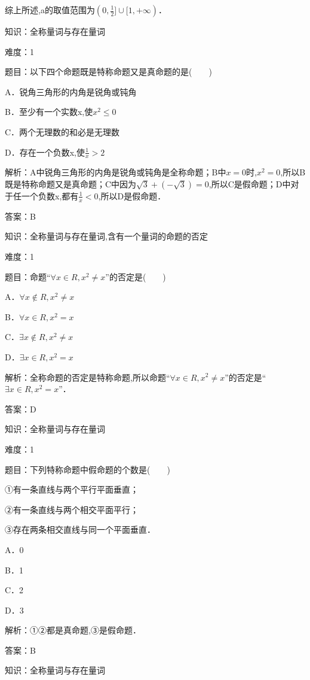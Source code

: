 \documentclass{article} %
\begin{document}
综上所述,a的取值范围为$(0,\frac{1}{2}]{\cup}[1,+{\infty})$．

\noindent 

知识：全称量词与存在量词

难度：1

题目：以下四个命题既是特称命题又是真命题的是(　　)

A．锐角三角形的内角是锐角或钝角

B．至少有一个实数x,使$x^{2}\le0$

C．两个无理数的和必是无理数

D．存在一个负数x,使$\frac{1}{x}>2$

解析：A中锐角三角形的内角是锐角或钝角是全称命题；B中$x=0$时,$x^{2}=0$,所以B既是特称命题又是真命题；C中因为$\sqrt{3}+(-\sqrt{3})=0$,所以C是假命题；D中对于任一个负数x,都有$\frac{1}{x}<0$,所以D是假命题．

答案：B



知识：全称量词与存在量词,含有一个量词的命题的否定

难度：1

题目：命题``$\forall x\in R,x^{2}\neq x$''的否定是(　　)

A．$\forall x\notin R,x^{2} \neq x$   

B．${\forall }x{\in}R,x^{2}=x$

C．${\exists }x{\notin}R,x^{2}{\neq}x$   

D．${\exists }x\in R,x^{2}=x$

解析：全称命题的否定是特称命题,所以命题``${\forall }x{\in}R,x^{2}{\neq}x$''的否定是``${\exists }x{\in}R,x^{2}=x$''．

答案：D



知识：全称量词与存在量词

难度：1

题目：下列特称命题中假命题的个数是(　　)

①有一条直线与两个平行平面垂直；

②有一条直线与两个相交平面平行；

③存在两条相交直线与同一个平面垂直．

A．0　　　　

B．1　　　　

C．2　　　　

D．3

解析：①②都是真命题,③是假命题．

答案：B



知识：全称量词与存在量词
\end{document}
